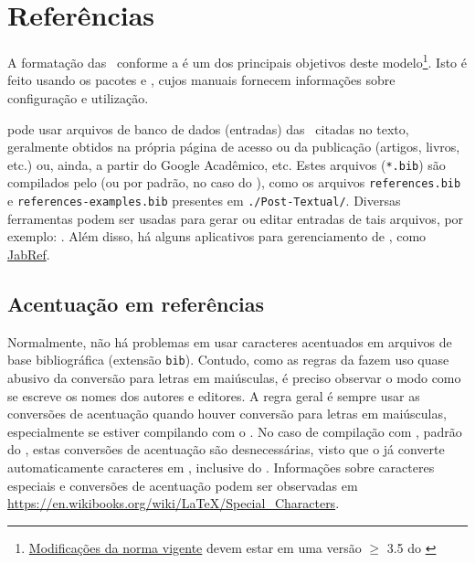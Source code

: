 \section{Referências}%
\label{sect:ref}

A formatação das \ conforme a \textcite[ 6023]{ABNT2018NBR6023} é um dos principais objetivos deste modelo\footnote{\href{https://github.com/abntex/biblatex-abnt/issues/42}{Modificações da norma vigente\LinkIcon} devem estar em uma versão $\ge$ 3.5 do \href{https://ctan.org/pkg/biblatex-abnt}{\LinkIcon}}.
Isto é feito usando os pacotes \href{https://ctan.org/pkg/biblatex}{\LinkIcon} e \href{https://ctan.org/pkg/biblatex-abnt}{\LinkIcon}, cujos manuais fornecem informações sobre configuração e utilização.

 pode usar arquivos de banco de dados (entradas) das \ citadas no texto, geralmente obtidos na própria página de acesso ou  da publicação (artigos, livros, etc.) ou, ainda, a partir do Google Acadêmico, etc.
Estes arquivos (\texttt{*.bib}) são compilados pelo  (ou  por padrão, no caso do \href{https://ctan.org/pkg/biblatex}{\LinkIcon}), como os arquivos \texttt{references.bib} e \texttt{references-examples.bib} presentes em \texttt{./Post-Textual/}.
Diversas ferramentas podem ser usadas para gerar ou editar entradas de tais arquivos, por exemplo: .
Além disso, há alguns aplicativos para gerenciamento de , como \href{https://www.jabref.org/}{JabRef\LinkIcon}.

\subsection{Acentuação em referências}%
\label{ssect:accnt-ref}

Normalmente, não há problemas em usar caracteres acentuados em arquivos de base bibliográfica (extensão \texttt{bib}).
Contudo, como as regras da  fazem uso quase abusivo da conversão para letras em maiúsculas, é preciso observar o modo como se escreve os nomes dos autores e editores.
A regra geral é sempre usar as conversões de acentuação quando houver conversão para letras em maiúsculas, especialmente se estiver compilando com o .
No caso de compilação com , padrão do \href{https://ctan.org/pkg/biblatex}{\LinkIcon}, estas conversões de acentuação são desnecessárias, visto que o  já converte automaticamente caracteres em , inclusive do .
Informações sobre caracteres especiais e conversões de acentuação podem ser observadas em \url{https://en.wikibooks.org/wiki/LaTeX/Special_Characters}.
